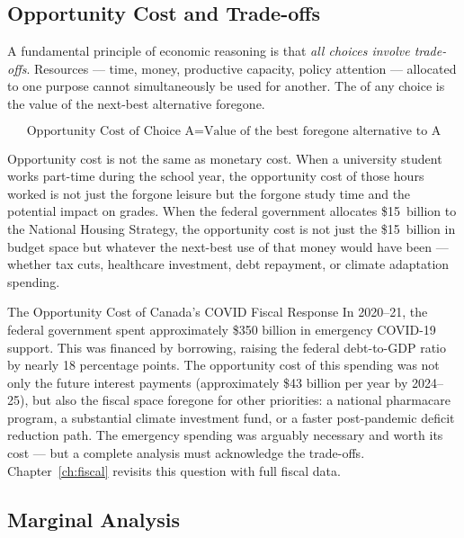 \subsection{Opportunity Cost and Trade-offs}

A fundamental principle of economic reasoning is that \textit{all choices
involve trade-offs}. Resources --- time, money, productive capacity, policy
attention --- allocated to one purpose cannot simultaneously be used for
another. The  of any choice is the value of the
next-best alternative foregone.

\begin{equation}
  \text{Opportunity Cost of Choice A} = \text{Value of the best foregone alternative to A}
  \label{eq:opportunity_cost}
\end{equation}

Opportunity cost is not the same as monetary cost. When a university student
works part-time during the school year, the opportunity cost of those hours
worked is not just the forgone leisure but the forgone study time and the
potential impact on grades. When the federal government allocates
\$15~billion to the National Housing Strategy, the opportunity cost is not
just the \$15~billion in budget space but whatever the next-best use of
that money would have been --- whether tax cuts, healthcare investment,
debt repayment, or climate adaptation spending.

\begin{canexample}{The Opportunity Cost of Canada's COVID Fiscal Response}
In 2020--21, the federal government spent approximately \$350 billion in
emergency COVID-19 support. This was financed by borrowing, raising the
federal debt-to-GDP ratio by nearly 18 percentage points. The opportunity
cost of this spending was not only the future interest payments
(approximately \$43 billion per year by 2024--25), but also the fiscal
space foregone for other priorities: a national pharmacare program, a
substantial climate investment fund, or a faster post-pandemic deficit
reduction path. The emergency spending was arguably necessary and worth
its cost --- but a complete analysis must acknowledge the trade-offs.
Chapter~\ref{ch:fiscal} revisits this question with full fiscal data.
\end{canexample}

\subsection{Marginal Analysis}


